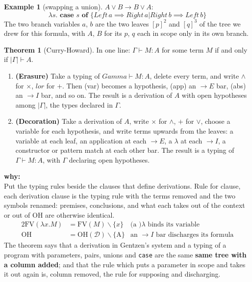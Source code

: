 \documentclass[a4paper, 11pt]{article}
\theoremstyle{definition}
\newtheorem{example}[definition]{Example}
\newtheorem{theorem}[definition]{Theorem}
\begin{document}
\begin{example}[swapping a union]
    $A \lor B \to B \lor A$: \[\lambda s. \textbf{ case } s \textbf{ of } \{\mathit{Left} \, a \implies \mathit{Right}
    \, a | \mathit{Right} \, b \implies \mathit{Left} \, b\}\]
    The two branch variables $a$, $b$ are the two leaves $[p]^2$ and $[q]^3$ of the tree we drew for this formula, with
    $A$, $B$ for its $p$, $q$ each in scope only in its own branch. 
\end{example}

\begin{theorem}[Curry-Howard]
    In one line: $\Gamma \vdash M : A$ for some term $M$ if and only if $|\Gamma| \vdash A$.

    \begin{enumerate} 
        \item \textbf{(Erasure)} Take a typing of $Gamma \vdash M:A$, delete every term, and write $\land$ for $\times$,
        $lor$ for $+$. Then (var) becomes a hypothesis, (app) an $\to E$ bar, (abs) an $\to I$ bar, and so on. The
        result is a derivation of $A$ with open hypotheses among $| \Gamma |$, the types declared in $\Gamma$.
        \item \textbf{(Decoration)} Take a derivation of $A$, write $\times$ for $\land$, $+$ for $\lor$, choose a
        variable for each hypothesis, and write terms upwards from the leaves: a variable at each leaf, an application
        at each $\to E$, a $\lambda$ at each $\to I$, a constructor or pattern match at each other bar. The result is a 
        typing of $\Gamma \vdash M:A$, with $\Gamma$ declaring open hypotheses.
    \end{enumerate}
    \textbf{why:} \\
    Put the typing rules beside the clauses that define derivations. Rule for clause, each derivation clause is the
    typing rule with the terms removed and the two symbols renamed: premises, conclusions, and what each takes out of 
    the context or out of OH are otherwise identical.
    \begin{align*}{2}
        \text{FV} (\lambda x. M) &= \text{FV}(M) \backslash \{x\} &\text{(a )} \lambda \text{ binds its variable} \\
        \text{OH} &= \text{OH}(\mathcal{D}) \backslash \{ \text{A} \} &\text{an } \to I \text{ bar discharges its formula}
    \end{align*}
    The theorem says that a derivation in Gentzen's system and a typing of a program with parameters, pairs, unions and
    \texttt{case} are the same \textbf{same tree with a column added}; and that the rule which puts a parameter in
    scope and takes it out again is, column removed, the rule for supposing and discharging. \\
\end{theorem}
\end{document}
